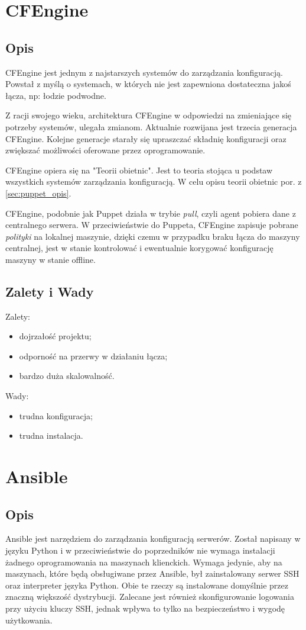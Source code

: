 \section{CFEngine}
\subsection{Opis}
CFEngine jest jednym z najstarszych systemów do zarządzania konfiguracją.
Powstał z myślą o systemach, w których nie jest zapewniona dostateczna jakoś łącza, np: łodzie podwodne.

Z racji swojego wieku, architektura CFEngine w odpowiedzi na zmieniające się potrzeby systemów, ulegała zmianom.
Aktualnie rozwijana jest trzecia generacja CFEngine.
Kolejne generacje starały się upraszczać składnię konfiguracji oraz zwiększać możliwości oferowane przez oprogramowanie.

CFEngine opiera się na "Teorii obietnic".
Jest to teoria stojąca u podstaw wszystkich systemów zarządzania konfiguracją. W celu opisu teorii obietnic por. z \ref{sec:puppet_opis}.

CFEngine, podobnie jak Puppet działa w trybie \textit{pull}, czyli agent pobiera dane z centralnego serwera.
W przeciwieństwie do Puppeta, CFEngine zapisuje pobrane \textit{polityki} na lokalnej maszynie, dzięki czemu w przypadku braku łącza do maszyny centralnej, jest w stanie kontrolować i ewentualnie korygować konfigurację maszyny w stanie offline.
\subsection{Zalety i Wady}
Zalety:
\begin{itemize}
	\item dojrzałość projektu;
	\item odporność na przerwy w działaniu łącza;
	\item bardzo duża skalowalność.
\end{itemize}
Wady:
\begin{itemize}
	\item trudna konfiguracja;
	\item trudna instalacja.
\end{itemize}
\section{Ansible}
\subsection{Opis}
Ansible jest narzędziem do zarządzania konfiguracją serwerów. Został napisany w języku Python i w przeciwieństwie do poprzedników nie wymaga instalacji żadnego oprogramowania na maszynach klienckich.
Wymaga jedynie, aby na maszynach, które będą obsługiwane przez Ansible, był zainstalowany serwer SSH oraz interpreter języka Python. Obie te rzeczy są instalowane domyślnie przez znaczną większość dystrybucji.
Zalecane jest również skonfigurowanie logowania przy użyciu kluczy SSH, jednak wpływa to tylko na bezpieczeństwo i wygodę użytkowania.\\
